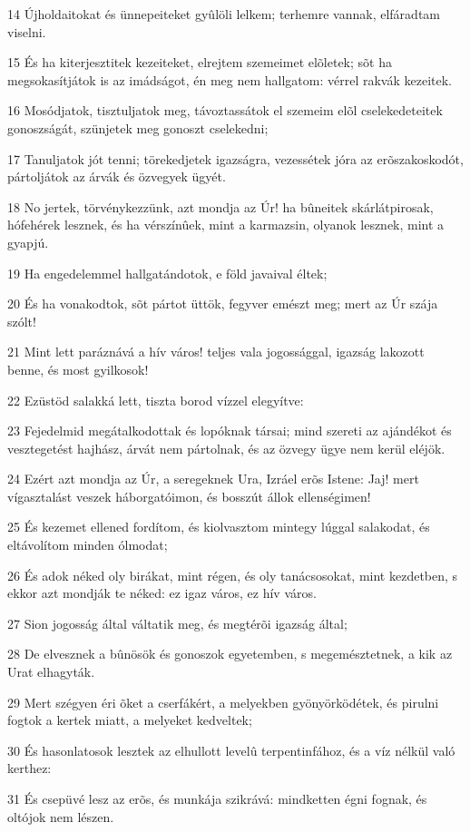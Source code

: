 \par 14 Újholdaitokat és ünnepeiteket gyûlöli lelkem; terhemre vannak, elfáradtam viselni.
\par 15 És ha kiterjesztitek kezeiteket, elrejtem szemeimet elõletek; sõt ha megsokasítjátok is az imádságot, én meg nem hallgatom: vérrel  rakvák kezeitek.
\par 16 Mosódjatok, tisztuljatok meg, távoztassátok el szemeim elõl cselekedeteitek gonoszságát, szünjetek meg gonoszt  cselekedni;
\par 17 Tanuljatok jót tenni; törekedjetek igazságra, vezessétek jóra az erõszakoskodót, pártoljátok az árvák és özvegyek ügyét.
\par 18 No jertek, törvénykezzünk, azt mondja az Úr! ha bûneitek skárlátpirosak, hófehérek lesznek, és ha vérszínûek, mint a karmazsin, olyanok lesznek, mint a gyapjú.
\par 19 Ha engedelemmel hallgatándotok, e föld javaival éltek;
\par 20 És ha vonakodtok, sõt pártot üttök, fegyver emészt meg; mert az Úr szája szólt!
\par 21 Mint lett paráznává a hív város! teljes vala jogossággal, igazság lakozott benne, és most gyilkosok!
\par 22 Ezüstöd salakká lett, tiszta borod vízzel elegyítve:
\par 23 Fejedelmid megátalkodottak és lopóknak társai; mind szereti az ajándékot és vesztegetést hajhász, árvát nem pártolnak, és az özvegy ügye nem kerül eléjök.
\par 24 Ezért azt mondja az Úr, a seregeknek Ura, Izráel erõs Istene: Jaj! mert vígasztalást veszek háborgatóimon, és bosszút állok ellenségimen!
\par 25 És kezemet ellened fordítom, és kiolvasztom mintegy lúggal salakodat, és eltávolítom minden ólmodat;
\par 26 És adok néked oly birákat, mint régen, és oly tanácsosokat, mint kezdetben, s ekkor azt mondják te néked: ez igaz város, ez hív város.
\par 27 Sion jogosság által váltatik meg, és megtérõi igazság által;
\par 28 De elvesznek a bûnösök és gonoszok egyetemben, s megemésztetnek, a kik az Urat elhagyták.
\par 29 Mert szégyen éri õket a cserfákért, a melyekben gyönyörködétek, és pirulni fogtok a kertek miatt, a melyeket kedveltek;
\par 30 És hasonlatosok lesztek az elhullott levelû terpentinfához, és a víz nélkül való kerthez:
\par 31 És csepüvé lesz az erõs, és munkája szikrává: mindketten égni fognak, és oltójok nem lészen.

